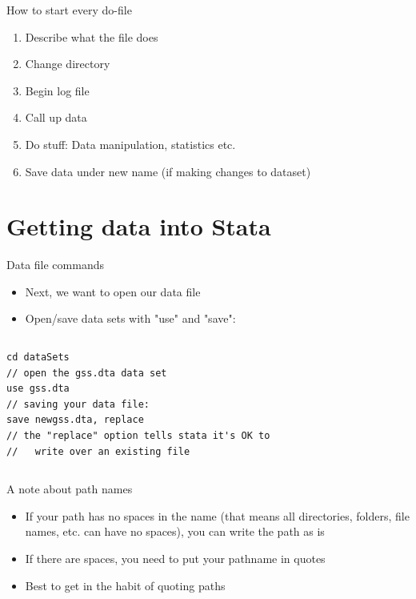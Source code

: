 \documentclass[table,smaller]{beamer}
\begin{document}
\begin{frame}[label=sec-1-11]{How to start every do-file}
\begin{enumerate}
\item Describe what the file does
\item Change directory
\item Begin log file
\item Call up data
\item Do stuff: Data manipulation, statistics etc.
\item Save data under new name (if making changes to dataset)
\end{enumerate}
\end{frame}



\section{Getting data into Stata}
\label{sec-2}


\begin{frame}[fragile,label=sec-2-1]{Data file commands}
 \begin{itemize}
\item Next, we want to open our data file
\item Open/save data sets with "use" and "save":
\end{itemize}

\vspace{-.5em} \begin{columns}  \begin{block}{}
\begin{verbatim}
cd dataSets
// open the gss.dta data set
use gss.dta
// saving your data file:
save newgss.dta, replace
// the "replace" option tells stata it's OK to 
//   write over an existing file
\end{verbatim}

\end{block} \end{columns}
\end{frame}

\begin{frame}[label=sec-2-2]{A note about path names}
\begin{itemize}
\item If your path has no spaces in the name (that means all directories, folders, file names, etc. can have no spaces), you can write the path as is
\item If there are spaces, you need to put your pathname in quotes
\item Best to get in the habit of quoting paths
\end{itemize}
\end{frame}
\end{document}
